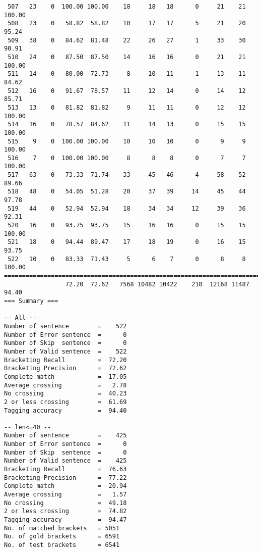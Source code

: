 \begin{verbatim}
 507   23    0  100.00 100.00    18     18   18      0     21    21   100.00
 508   23    0   58.82  58.82    10     17   17      5     21    20    95.24
 509   38    0   84.62  81.48    22     26   27      1     33    30    90.91
 510   24    0   87.50  87.50    14     16   16      0     21    21   100.00
 511   14    0   80.00  72.73     8     10   11      1     13    11    84.62
 512   16    0   91.67  78.57    11     12   14      0     14    12    85.71
 513   13    0   81.82  81.82     9     11   11      0     12    12   100.00
 514   16    0   78.57  84.62    11     14   13      0     15    15   100.00
 515    9    0  100.00 100.00    10     10   10      0      9     9   100.00
 516    7    0  100.00 100.00     8      8    8      0      7     7   100.00
 517   63    0   73.33  71.74    33     45   46      4     58    52    89.66
 518   48    0   54.05  51.28    20     37   39     14     45    44    97.78
 519   44    0   52.94  52.94    18     34   34     12     39    36    92.31
 520   16    0   93.75  93.75    15     16   16      0     15    15   100.00
 521   18    0   94.44  89.47    17     18   19      0     16    15    93.75
 522   10    0   83.33  71.43     5      6    7      0      8     8   100.00
============================================================================
                 72.20  72.62   7568 10482 10422    210  12168 11487    94.40
=== Summary ===

-- All --
Number of sentence        =    522
Number of Error sentence  =      0
Number of Skip  sentence  =      0
Number of Valid sentence  =    522
Bracketing Recall         =  72.20
Bracketing Precision      =  72.62
Complete match            =  17.05
Average crossing          =   2.78
No crossing               =  40.23
2 or less crossing        =  61.69
Tagging accuracy          =  94.40

-- len<=40 --
Number of sentence        =    425
Number of Error sentence  =      0
Number of Skip  sentence  =      0
Number of Valid sentence  =    425
Bracketing Recall         =  76.63
Bracketing Precision      =  77.22
Complete match            =  20.94
Average crossing          =   1.57
No crossing               =  49.18
2 or less crossing        =  74.82
Tagging accuracy          =  94.47
No. of matched brackets   = 5051
No. of gold brackets      = 6591
No. of test brackets      = 6541

\end{verbatim}

\normalsize

